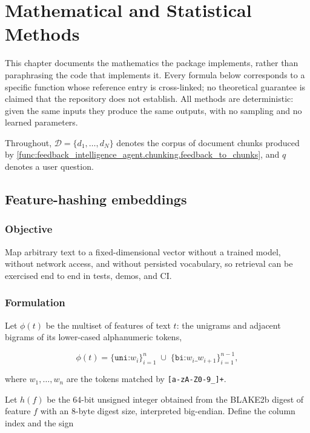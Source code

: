 
\chapter{Mathematical and Statistical Methods}
\label{ch:mathematics}

This chapter documents the mathematics the package implements, rather than
paraphrasing the code that implements it. Every formula below corresponds to
a specific function whose reference entry is cross-linked; no theoretical
guarantee is claimed that the repository does not establish. All methods are
deterministic: given the same inputs they produce the same outputs, with no
sampling and no learned parameters.

Throughout, $\mathcal{D} = \{d_1,\dots,d_N\}$ denotes the corpus of document
chunks produced by \cref{func:feedback_intelligence_agent.chunking.feedback_to_chunks},
and $q$ denotes a user question.

\section{Feature-hashing embeddings}
\label{sec:math-embeddings}

\subsection*{Objective}

Map arbitrary text to a fixed-dimensional vector without a trained model,
without network access, and without persisted vocabulary, so retrieval can be
exercised end to end in tests, demos, and CI.

\subsection*{Formulation}

Let $\phi(t)$ be the multiset of features of text $t$: the unigrams and
adjacent bigrams of its lower-cased alphanumeric tokens,

\begin{equation}
\phi(t) = \{\texttt{uni:}w_i\}_{i=1}^{n}
        \;\cup\;
        \{\texttt{bi:}w_i\_w_{i+1}\}_{i=1}^{n-1},
\end{equation}

where $w_1,\dots,w_n$ are the tokens matched by \texttt{[a-zA-Z0-9\_]+}.

Let $h(f)$ be the 64-bit unsigned integer obtained from the BLAKE2b digest of
feature $f$ with an 8-byte digest size, interpreted big-endian. Define the
column index and the sign

